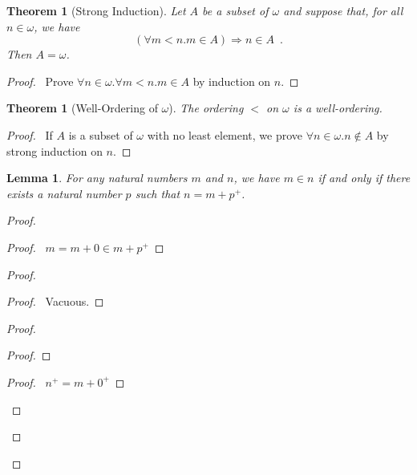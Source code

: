 \documentclass{report}
\let\qed\relax
\newtheorem{lemma}[axiom]{Lemma}
\newtheorem{theorem}[axiom]{Theorem}
\theoremstyle{definition}
\begin{document}
    \begin{theorem}[Strong Induction]
        Let $A$ be a subset of $\omega$ and suppose that, for all $n \in \omega$, we have
        \[ (\forall m < n. m \in A) \Rightarrow n \in A \enspace . \]
        Then $A = \omega$.
    \end{theorem}

    \begin{proof}
        \pf\ Prove $\forall n \in \omega. \forall m < n. m \in A$ by induction on $n$. \qed
    \end{proof}
    
    \begin{theorem}[Well-Ordering of $\omega$]
        The ordering $<$ on $\omega$ is a well-ordering.
    \end{theorem}
    
    \begin{proof}
        \pf\ If $A$ is a subset of $\omega$ with no least element, we prove $\forall n \in \omega. n \notin A$
        by strong induction on $n$. \qed
    \end{proof}

    \begin{lemma}
        \label{lemma:subtraction}
        For any natural numbers $m$ and $n$, we have $m \in n$ if and only if there exists a natural number
        $p$ such that $n = m + p^+$.
    \end{lemma}
    
    \begin{proof}
        \pf
        \begin{proof}
            \pf\ $m = m + 0 \in m + p^+$
        \end{proof}
        \begin{proof}
            \begin{proof}
                \pf\ Vacuous.
            \end{proof}
            \begin{proof}
                \begin{proof}
                \end{proof}
                \begin{proof}
                    \pf\ $n^+ = m + 0^+$
                \end{proof}
            \end{proof}
        \end{proof}
        \qed
    \end{proof}
\end{document}
